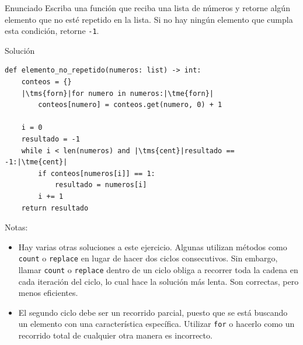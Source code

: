 \documentclass{ip-quiz}
\begin{document}
\makeheader
\maketitle

\begin{sectionbox}{Enunciado}
Escriba una función que reciba una lista de números y retorne algún elemento que no esté repetido en la lista. Si no hay ningún elemento que cumpla esta condición, retorne \texttt{-1}.
\end{sectionbox}

\begin{sectionbox}{Solución}
\begin{verbatim}
def elemento_no_repetido(numeros: list) -> int:
    conteos = {}
    |\tms{forn}|for numero in numeros:|\tme{forn}|
        conteos[numero] = conteos.get(numero, 0) + 1

    i = 0
    resultado = -1
    while i < len(numeros) and |\tms{cent}|resultado == -1:|\tme{cent}|
        if conteos[numeros[i]] == 1:
            resultado = numeros[i]
        i += 1
    return resultado
\end{verbatim}

\end{sectionbox}

Notas:
\begin{itemize}
    \item Hay varias otras soluciones a este ejercicio. Algunas utilizan métodos como \texttt{count} o \texttt{replace} en lugar de hacer dos ciclos consecutivos. Sin embargo, llamar \texttt{count} o \texttt{replace} dentro de un ciclo obliga a recorrer toda la cadena en cada iteración del ciclo, lo cual hace la solución más lenta. Son correctas, pero menos eficientes.
    \item El segundo ciclo debe ser un recorrido parcial, puesto que se está buscando un elemento con una característica específica. Utilizar \texttt{for} o hacerlo como un recorrido total de cualquier otra manera es incorrecto.
\end{itemize}
\end{document}
